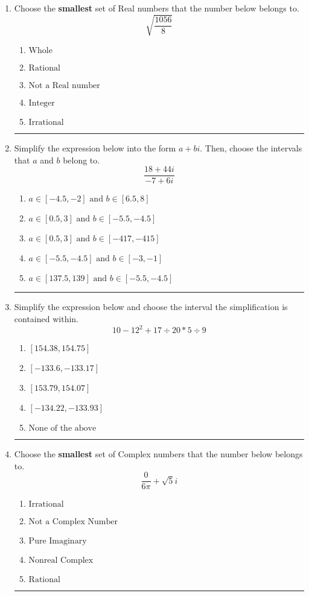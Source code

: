\documentclass[14pt]{extbook}
\newcommand{\litem}[1]{\item#1\hspace*{-1cm}\rule{\textwidth}{0.4pt}}
\begin{document}
\begin{enumerate}
{\begin{enumerate}[label=\Alph*.]
\end{enumerate} }
\litem{
Choose the \textbf{smallest} set of Real numbers that the number below belongs to.\[ \sqrt{\frac{1056}{8}} \]\begin{enumerate}[label=\Alph*.]
\item \( \text{Whole} \)
\item \( \text{Rational} \)
\item \( \text{Not a Real number} \)
\item \( \text{Integer} \)
\item \( \text{Irrational} \)

\end{enumerate} }
\litem{
Simplify the expression below into the form $a+bi$. Then, choose the intervals that $a$ and $b$ belong to.\[ \frac{18 + 44 i}{-7 + 6 i} \]\begin{enumerate}[label=\Alph*.]
\item \( a \in [-4.5, -2] \text{ and } b \in [6.5, 8] \)
\item \( a \in [0.5, 3] \text{ and } b \in [-5.5, -4.5] \)
\item \( a \in [0.5, 3] \text{ and } b \in [-417, -415] \)
\item \( a \in [-5.5, -4.5] \text{ and } b \in [-3, -1] \)
\item \( a \in [137.5, 139] \text{ and } b \in [-5.5, -4.5] \)

\end{enumerate} }
\litem{
Simplify the expression below and choose the interval the simplification is contained within.\[ 10 - 12^2 + 17 \div 20 * 5 \div 9 \]\begin{enumerate}[label=\Alph*.]
\item \( [154.38, 154.75] \)
\item \( [-133.6, -133.17] \)
\item \( [153.79, 154.07] \)
\item \( [-134.22, -133.93] \)
\item \( \text{None of the above} \)

\end{enumerate} }
\litem{
Choose the \textbf{smallest} set of Complex numbers that the number below belongs to.\[ \frac{0}{6 \pi}+\sqrt{5}i \]\begin{enumerate}[label=\Alph*.]
\item \( \text{Irrational} \)
\item \( \text{Not a Complex Number} \)
\item \( \text{Pure Imaginary} \)
\item \( \text{Nonreal Complex} \)
\item \( \text{Rational} \)


\end{enumerate}}
\end{enumerate}
\end{document}
